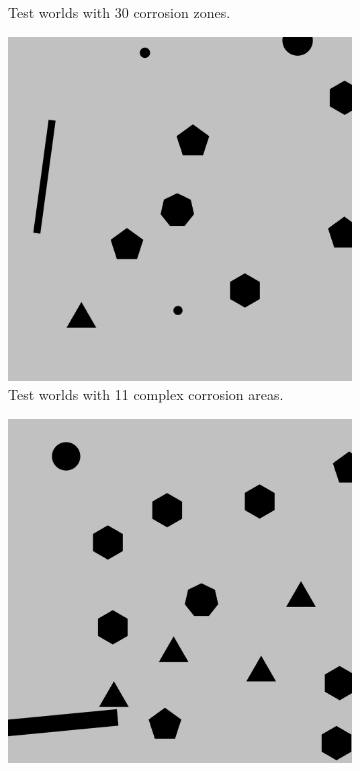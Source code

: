 \documentclass[english,RandD]{rapportPFE}  %
\begin{document}
\begin{figure}[H]
\begin{subfigure}[t]{0.15\linewidth}
				\caption{Test worlds with 30 corrosion zones.}
				\label{fig:test_model_30_1}
			\end{subfigure}
			\hfill
			\begin{subfigure}[t]{0.15\linewidth}
					\includegraphics[width=\linewidth]{graphics/test_model_11_complex_1.png}
					\caption{Test worlds with 11 complex corrosion areas.}
					\label{fig:test_model_11_complex_1}
			\end{subfigure}
			\hfill
			\begin{subfigure}[t]{0.15\linewidth}
				\centering
				\includegraphics[width=\linewidth]{graphics/test_model_15_complex_1.png}

\end{subfigure}
\end{figure}
\end{document}
